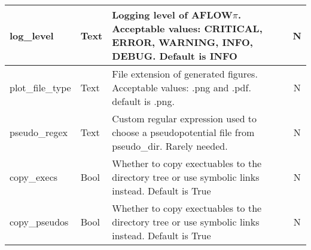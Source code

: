 \documentclass[11pt]{article}
\begin{document}
\begin{center}
\begin{tabular}{|p{3cm}|l|p{9cm}|c|}
log\_level       & Text & Logging level of AFLOW$\pi$. Acceptable values: CRITICAL, ERROR, WARNING, INFO, DEBUG. Default is INFO & N\\
\hline
plot\_file\_type & Text & File extension of generated figures. Acceptable values: .png and .pdf. default is .png.& N \\
\hline
pseudo\_regex    & Text & Custom regular expression used to choose a pseudopotential file from pseudo\_dir. Rarely needed.& N\\
\hline
copy\_execs      & Bool & Whether to copy exectuables to the directory tree or use symbolic links instead. Default is True& N  \\
\hline
copy\_pseudos    & Bool & Whether to copy exectuables to the directory tree or use symbolic links instead. Default is True & N\\
\hline


\end{tabular}

\end{center}
\end{document}
